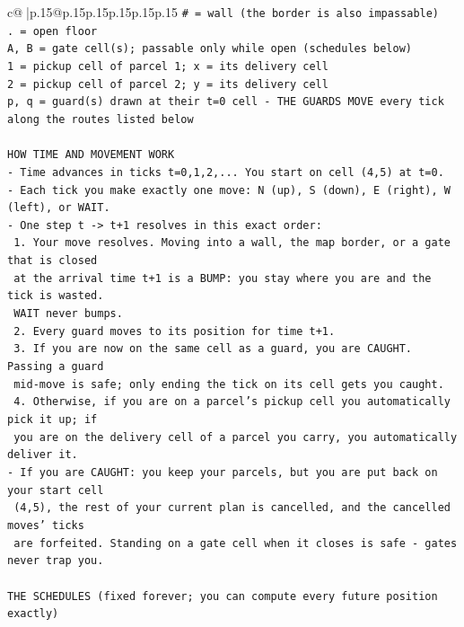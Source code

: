 \documentclass{article}
\begin{document}
{\begin{supertabular}{c@{$\;$}|p{.15\linewidth}@{}p{.15\linewidth}p{.15\linewidth}p{.15\linewidth}p{.15\linewidth}p{.15\linewidth}}
{{{\texttt{\# = wall (the border is also impassable)} \\
\texttt{. = open floor} \\
\texttt{A, B = gate cell(s); passable only while open (schedules below)} \\
\texttt{1 = pickup cell of parcel 1; x = its delivery cell} \\
\texttt{2 = pickup cell of parcel 2; y = its delivery cell} \\
\texttt{p, q = guard(s) drawn at their t=0 cell {-} THE GUARDS MOVE every tick along the routes listed below} \\
\\ 
\texttt{HOW TIME AND MOVEMENT WORK} \\
\texttt{{-} Time advances in ticks t=0,1,2,... You start on cell (4,5) at t=0.} \\
\texttt{{-} Each tick you make exactly one move: N (up), S (down), E (right), W (left), or WAIT.} \\
\texttt{{-} One step t {-}> t+1 resolves in this exact order:} \\
\texttt{  1. Your move resolves. Moving into a wall, the map border, or a gate that is closed} \\
\texttt{     at the arrival time t+1 is a BUMP: you stay where you are and the tick is wasted.} \\
\texttt{     WAIT never bumps.} \\
\texttt{  2. Every guard moves to its position for time t+1.} \\
\texttt{  3. If you are now on the same cell as a guard, you are CAUGHT. Passing a guard} \\
\texttt{     mid{-}move is safe; only ending the tick on its cell gets you caught.} \\
\texttt{  4. Otherwise, if you are on a parcel's pickup cell you automatically pick it up; if} \\
\texttt{     you are on the delivery cell of a parcel you carry, you automatically deliver it.} \\
\texttt{{-} If you are CAUGHT: you keep your parcels, but you are put back on your start cell} \\
\texttt{  (4,5), the rest of your current plan is cancelled, and the cancelled moves' ticks} \\
\texttt{  are forfeited. Standing on a gate cell when it closes is safe {-} gates never trap you.} \\
\\ 
\texttt{THE SCHEDULES (fixed forever; you can compute every future position exactly)} \\
}}}
\end{supertabular}}
\end{document}

